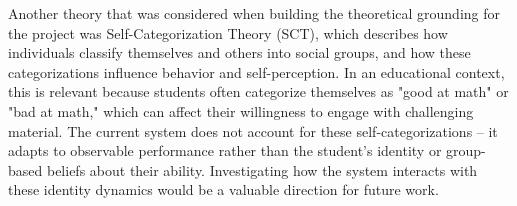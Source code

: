Another theory that was considered when building the theoretical grounding for the project was Self-Categorization Theory (SCT), which describes how individuals classify themselves and others into social groups, and how these categorizations influence behavior and self-perception. In an educational context, this is relevant because students often categorize themselves as "good at math" or "bad at math," which can affect their willingness to engage with challenging material. The current system does not account for these self-categorizations -- it adapts to observable performance rather than the student's identity or group-based beliefs about their ability. Investigating how the system interacts with these identity dynamics would be a valuable direction for future work.
